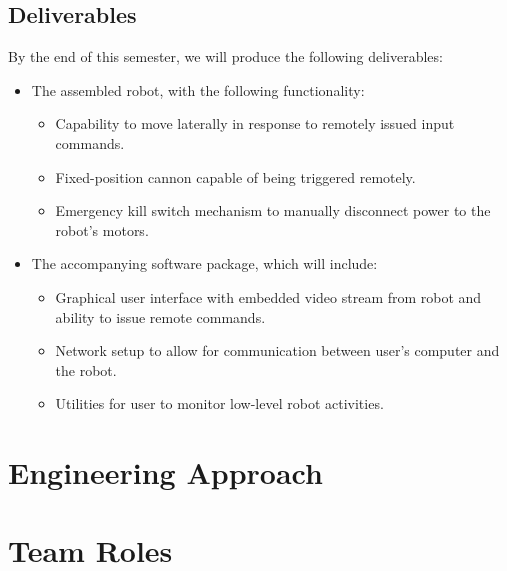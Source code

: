 \documentclass[letterpaper,12pt]{article}
\begin{document}
\subsection{Deliverables}
By the end of this semester, we will produce the following deliverables:
\begin{itemize}
\item The assembled robot, with the following functionality:
  \begin{itemize}
  \item Capability to move laterally in response to remotely issued input commands.
  \item Fixed-position cannon capable of being triggered remotely.
  \item Emergency kill switch mechanism to manually disconnect power to the robot's motors.
  \end{itemize}
\item The accompanying software package, which will include:
  \begin{itemize}
  \item Graphical user interface with embedded video stream from robot and ability to issue remote commands.
  \item Network setup to allow for communication between user's computer and the robot.
  \item Utilities for user to monitor low-level robot activities.
  \end{itemize}
\end{itemize}

\section{Engineering Approach}
\subsection{} %
\subsection{}
\subsection{}

\section{Team Roles}
\end{document}
